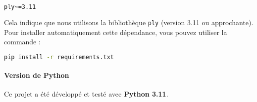 \documentclass[a4paper,12pt]{article}
\begin{document}
\begin{lstlisting}[language=bash, caption={requirements.txt}, label={lst:requirements}]
ply~=3.11
\end{lstlisting}

Cela indique que nous utilisons la bibliothèque \texttt{ply} (version 3.11 ou approchante). Pour installer automatiquement cette dépendance, vous pouvez utiliser la commande :
\begin{lstlisting}[language=bash, caption={Installation des dépendances}, label={lst:install}]
pip install -r requirements.txt
\end{lstlisting}

\paragraph{Version de Python}
Ce projet a été développé et testé avec \textbf{Python 3.11}.
\end{document}
